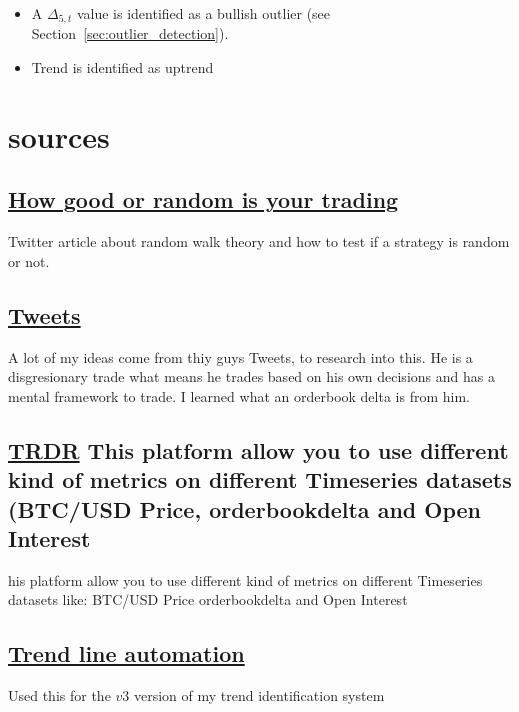 \documentclass[12pt]{article}
\begin{document}
\begin{itemize}
  \item  A $\Delta_{5,t}$ value is identified as a bullish outlier (see Section~\ref{sec:outlier_detection}).
  \item Trend is identified as uptrend
\end{itemize}












\newpage
\section{sources}
{\small
\subsection{\href{https://x.com/HangukQuant/status/1930603876069335120}{How good or random is your trading}}
Twitter article about random walk theory and how to test if a strategy is random or not. 
\subsection{\href{https://x.com/abetrade/status/1941613701150188008}{Tweets}}
A lot of my ideas come from thiy guys Tweets, to research into this. He is a disgresionary trade what means he trades based on his own decisions and has a mental framework to trade. I learned what an orderbook delta is from him.
\subsection{\href{https://trdr.io/}{TRDR} This platform allow you to use different kind of metrics on different Timeseries datasets (BTC/USD Price, orderbookdelta  and Open Interest}his platform allow you to use different kind of metrics on different Timeseries datasets like: BTC/USD Price orderbookdelta  and Open Interest
\subsection{\href{https://github.com/neurotrader888/TrendLineAutomation}{Trend line automation}} Used this for the $v3$ version of my trend identification system
}
\end{document}
